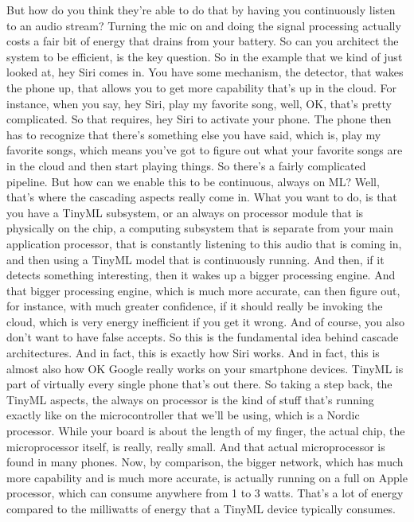 But how do you think they're able to do that by having you continuously listen
to an audio stream?
Turning the mic on and doing the signal processing actually
costs a fair bit of energy that drains from your battery.
So can you architect the system to be efficient, is the key question.
So in the example that we kind of just looked at, hey Siri comes in.
You have some mechanism, the detector, that wakes the phone up,
that allows you to get more capability that's up in the cloud.
For instance, when you say, hey Siri, play my favorite song,
well, OK, that's pretty complicated.
So that requires, hey Siri to activate your phone.
The phone then has to recognize that there's something else you have said,
which is, play my favorite songs, which means
you've got to figure out what your favorite songs are in the cloud
and then start playing things.
So there's a fairly complicated pipeline.
But how can we enable this to be continuous, always on ML?
Well, that's where the cascading aspects really come in.
What you want to do, is that you have a TinyML subsystem, or an always
on processor module that is physically on the chip, a computing subsystem that
is separate from your main application processor, that is constantly
listening to this audio that is coming in,
and then using a TinyML model that is continuously running.
And then, if it detects something interesting,
then it wakes up a bigger processing engine.
And that bigger processing engine, which is much more accurate,
can then figure out, for instance, with much greater confidence, if it should
really be invoking the cloud, which is very energy
inefficient if you get it wrong.
And of course, you also don't want to have false accepts.
So this is the fundamental idea behind cascade architectures.
And in fact, this is exactly how Siri works.
And in fact, this is almost also how OK Google really
works on your smartphone devices.
TinyML is part of virtually every single phone that's out there.
So taking a step back, the TinyML aspects, the always on processor
is the kind of stuff that's running exactly
like on the microcontroller that we'll be using, which is a Nordic processor.
While your board is about the length of my finger,
the actual chip, the microprocessor itself, is really, really small.
And that actual microprocessor is found in many phones.
Now, by comparison, the bigger network, which has much more capability
and is much more accurate, is actually running on a full on Apple
processor, which can consume anywhere from 1 to 3 watts.
That's a lot of energy compared to the milliwatts of energy
that a TinyML device typically consumes.
